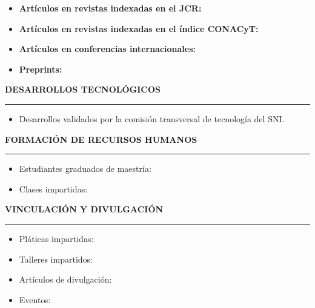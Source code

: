 \documentclass[10pt]{article}
\begin{document}

\begin{itemize}
	\item \textbf{Artículos en revistas indexadas en el JCR:}
	
	
	\item \textbf{Artículos en revistas indexadas en el índice CONACyT:}
	
	
	\item \textbf{Artículos en conferencias internacionales:}
	
	
	\item \textbf{Preprints:}
	
\end{itemize} 

\vspace{0.3cm}
\textbf{DESARROLLOS TECNOLÓGICOS}
\vspace{3pt}
\hrule
\begin{itemize}
	\item Desarrollos validados por la comisión transversal de tecnología del SNI.
	
\end{itemize}


\vspace{0.3cm}
{\bf FORMACIÓN DE RECURSOS HUMANOS}
\vspace{3pt}
\hrule

\begin{itemize}
	\item Estudiantes graduados de maestría:
	
	
	\item Clases impartidas:
	
\end{itemize}


\vspace{0.3cm}
\textbf{VINCULACIÓN Y DIVULGACIÓN}
\vspace{3pt}
\hrule

\begin{itemize}
	\item Pláticas impartidas:
	
	
	\item Talleres impartidos:
	
	
	\item Artículos de divulgación:
	
	
	\item Eventos:
	
\end{itemize}
\end{document}
